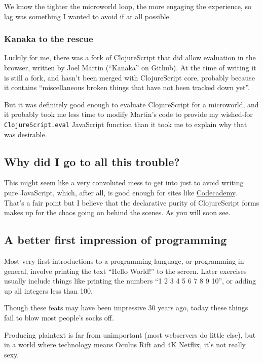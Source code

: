 We know the tighter the microworld loop, the more engaging the experience, so lag was something I wanted to avoid if at all possible.

\subsubsection{Kanaka to the rescue}

Luckily for me, there was a \href{https://github.com/kanaka/clojurescript}{fork of ClojureScript} that did allow evaluation in the browser, written by Joel Martin
(``Kanaka'' on Github). At the time of writing it is still a fork, and
hasn't been merged with ClojureScript core, probably because it contains
``miscellaneous broken things that have not been tracked down yet''.

But it was definitely good enough to evaluate ClojureScript for a
microworld, and it probably took me less time to modify Martin's code to
provide my wished-for \texttt{ClojureScript.eval} JavaScript function
than it took me to explain why that was desirable.

\subsection{Why did I go to all this trouble?}

This might seem like a very convoluted mess to get into just to avoid
writing pure JavaScript, which, after all, is good enough for sites like
\href{http://codecademy.com}{Codecademy}. That's a fair point but I believe that the declarative
purity of ClojureScript forms makes up for the chaos going on behind the
scenes. As you will soon see.

\subsection{A better first impression of programming}

Most very-first-introductions to a programming language, or programming
in general, involve printing the text ``Hello World!'' to the screen.
Later exercises usually include things like printing the numbers ``1 2 3
4 5 6 7 8 9 10'', or adding up all integers less than 100.

Though these feats may have been impressive 30 years ago, today these things fail to blow
most people's socks off.

Producing plaintext is far from unimportant (most webservers do little
else), but in a world where technology means Oculus Rift and 4K Netflix,
it's not really sexy.

